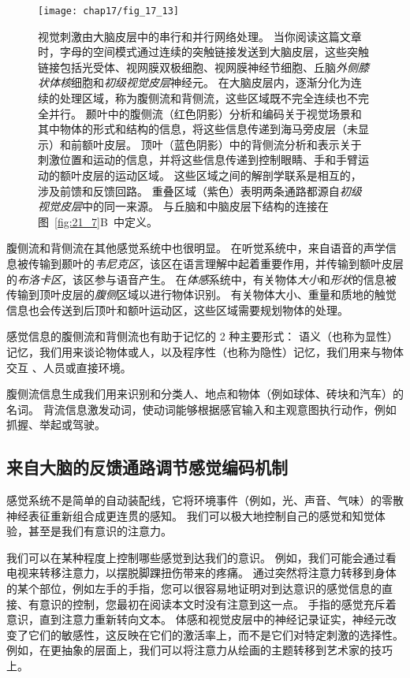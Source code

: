 \begin{figure}[htbp]
	\centering
	\texttt{[image: chap17/fig\_17\_13]}
	\caption{视觉刺激由大脑皮层中的串行和并行网络处理。 
		当你阅读这篇文章时，字母的空间模式通过连续的突触链接发送到大脑皮层，这些突触链接包括光受体、视网膜双极细胞、视网膜神经节细胞、丘脑\textit{外侧膝状体核}细胞和\textit{初级视觉皮层}神经元。
		在大脑皮层内，逐渐分化为连续的处理区域，称为腹侧流和背侧流，这些区域既不完全连续也不完全并行。
		颞叶中的腹侧流（红色阴影）分析和编码关于视觉场景和其中物体的形式和结构的信息，将这些信息传递到海马旁皮层（未显示）和前额叶皮层。
		顶叶（蓝色阴影）中的背侧流分析和表示关于刺激位置和运动的信息，并将这些信息传递到控制眼睛、手和手臂运动的额叶皮层的运动区域。
		这些区域之间的解剖学联系是相互的，涉及前馈和反馈回路。
		重叠区域（紫色）表明两条通路都源自\textit{初级视觉皮层}中的同一来源。
		与丘脑和中脑皮层下结构的连接在图~\ref{fig:21_7}B~中定义\cite{albright2002contextual}。}
	\label{fig:17_13}
\end{figure}


腹侧流和背侧流在其他感觉系统中也很明显。
在听觉系统中，来自语音的声学信息被传输到颞叶的\textit{韦尼克区}，该区在语言理解中起着重要作用，并传输到额叶皮层的\textit{布洛卡区}，该区参与语音产生。
在\textit{体感}系统中，有关物体\textit{大小}和\textit{形状}的信息被传输到顶叶皮层的\textit{腹侧}区域以进行物体识别。
有关物体大小、重量和质地的触觉信息也会传送到后顶叶和额叶运动区，这些区域需要规划物体的处理。


感觉信息的腹侧流和背侧流也有助于记忆的 2 种主要形式：
语义（也称为显性）记忆，我们用来谈论物体或人，以及程序性（也称为隐性）记忆，我们用来与物体交互 、人员或直接环境。


腹侧流信息生成我们用来识别和分类人、地点和物体（例如球体、砖块和汽车）的名词。 
背流信息激发动词，使动词能够根据感官输入和主观意图执行动作，例如抓握、举起或驾驶。



\subsection{来自大脑的反馈通路调节感觉编码机制}

感觉系统不是简单的自动装配线，它将环境事件（例如，光、声音、气味）的零散神经表征重新组合成更连贯的感知。
我们可以极大地控制自己的感觉和知觉体验，甚至是我们有意识的注意力。


我们可以在某种程度上控制哪些感觉到达我们的意识。
例如，我们可能会通过看电视来转移注意力，以摆脱脚踝扭伤带来的疼痛。 
通过突然将注意力转移到身体的某个部位，例如左手的手指，您可以很容易地证明对到达意识的感觉信息的直接、有意识的控制，您最初在阅读本文时没有注意到这一点。
手指的感觉充斥着意识，直到注意力重新转向文本。
体感和视觉皮层中的神经记录证实，神经元改变了它们的敏感性，这反映在它们的激活率上，而不是它们对特定刺激的选择性。
例如，在更抽象的层面上，我们可以将注意力从绘画的主题转移到艺术家的技巧上。


